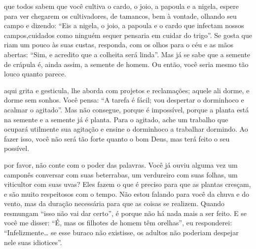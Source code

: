  que todos sabem que você cultiva o cardo, o joio, a papoula e a
nigela, espere para ver chegarem os cultivadores, de tamancos, bem à
vontade, olhando seu campo e dizendo: ``Eis a nigela, o joio, a papoula
e o cardo que infectam nossos campos,cuidados como ninguém sequer
pensaria em cuidar do trigo''. Se gosta que riam um pouco às suas
custas, responda, com os olhos para o céu e as mãos abertas: ``Sim, e
acredito que a colheita será linda''. Mas já se sabe que a semente de
crápula é, ainda assim, a semente de homem. Ou então, você seria mesmo
tão louco quanto parece. \enlargethispage{\baselineskip}

\pagebreak

 aqui grita e gesticula, lhe aborda com projetos e reclamações;
aquele ali dorme, e dorme sem sonhos. Você pensa: ``A tarefa é fácil;
vou despertar o dorminhoco e acalmar o agitado''. Mas não consegue,
porque é impossível, porque a planta está na semente e a semente já é
planta. Para o agitado, ache um trabalho que ocupará utilmente sua
agitação e ensine o dorminhoco a trabalhar dormindo. Ao fazer isso, você
não será tão forte quanto o bom Deus, mas terá feito o seu possível.



 por favor, não conte com o poder das palavras. Você já ouviu alguma
vez um camponês conversar com suas beterrabas, um verdureiro com suas
folhas, um viticultor com suas uvas? Eles fazem o que é preciso para que
as plantas cresçam, e são muito respeitosos com o tempo. Não estou
falando para você da chuva e do vento, mas da duração necessária para
que as coisas se realizem. Quando resmungam ``isso não vai dar certo'',
é porque não há nada mais a ser feito. E se você me disser: ``É, mas os
filhotes de homem têm orelhas'', eu responderei: ``Infelizmente\ldots{} se
esse buraco não existisse, os adultos não poderiam despejar nele suas
idiotices''.


\pagebreak
\thispagestyle{empty}

